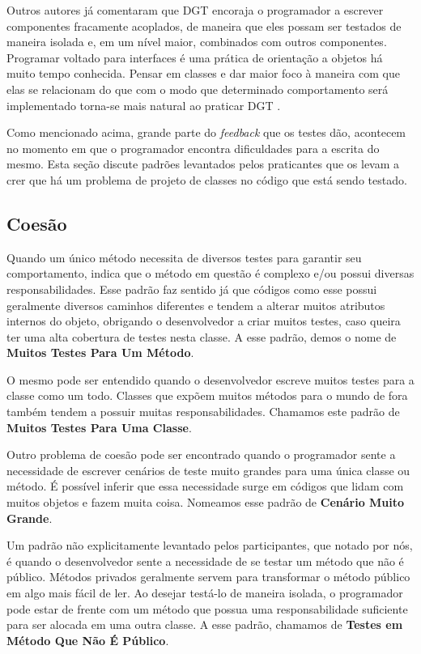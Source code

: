 Outros autores já comentaram que 
DGT encoraja o programador a escrever componentes fracamente acoplados, de
maneira que eles possam ser testados de maneira isolada e, em um nível maior,
combinados com outros componentes.
Programar voltado para interfaces é uma prática de orientação a objetos há muito
tempo conhecida. Pensar em classes e dar maior foco à maneira com que
elas se relacionam do que com o modo que determinado comportamento será implementado
torna-se mais natural ao praticar DGT \cite{GOOS}. 

Como mencionado acima, grande parte do \textit{feedback} que os testes
dão, acontecem no momento em que o programador encontra dificuldades para a
escrita do mesmo. Esta seção discute padrões levantados pelos praticantes
que os levam a crer que há um problema de projeto de classes no código
que está sendo testado.

\subsection{Coesão}

Quando um único método necessita de diversos testes para garantir seu comportamento,
indica que o método em questão é complexo e/ou possui diversas responsabilidades.
Esse padrão faz sentido já que códigos como esse possui geralmente diversos caminhos
diferentes e tendem a alterar muitos atributos internos do objeto, obrigando o desenvolvedor
a criar muitos testes, caso queira ter uma alta cobertura de testes nesta classe.
A esse padrão, demos o nome de \textbf{Muitos Testes Para Um Método}.

O mesmo pode ser entendido quando o desenvolvedor escreve muitos testes para a 
classe como um todo. Classes que expõem muitos métodos para o mundo de fora
também tendem a possuir muitas responsabilidades. Chamamos este padrão
de \textbf{Muitos Testes Para Uma Classe}.

Outro problema de coesão pode ser encontrado quando o programador
sente a necessidade de escrever cenários de teste muito grandes para uma
única classe ou método. É possível inferir que essa necessidade surge 
em códigos que lidam com muitos objetos e fazem muita coisa. Nomeamos
esse padrão de \textbf{Cenário Muito Grande}.

Um padrão não explicitamente levantado pelos participantes, que notado
por nós, é quando o desenvolvedor sente a necessidade de se testar
um método que não é público. Métodos privados geralmente servem para 
transformar o método público em algo mais fácil de ler. Ao desejar
testá-lo de maneira isolada, o programador pode estar de frente com
um método que possua uma responsabilidade suficiente para ser
alocada em uma outra classe. A esse padrão, chamamos de 
\textbf{Testes em Método Que Não É Público}.

